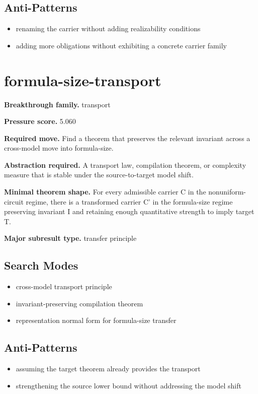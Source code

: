 \documentclass[11pt]{article}
\begin{document}
\subsection*{Anti-Patterns}
\begin{itemize}[leftmargin=*,itemsep=0.2em]
\item renaming the carrier without adding realizability conditions
\item adding more obligations without exhibiting a concrete carrier family
\end{itemize}
\section{formula-size-transport}
\textbf{Breakthrough family.} transport

\textbf{Pressure score.} 5.060

\textbf{Required move.} Find a theorem that preserves the relevant invariant across a cross-model move into formula-size.

\textbf{Abstraction required.} A transport law, compilation theorem, or complexity measure that is stable under the source-to-target model shift.

\textbf{Minimal theorem shape.} For every admissible carrier C in the nonuniform-circuit regime, there is a transformed carrier C' in the formula-size regime preserving invariant I and retaining enough quantitative strength to imply target T.

\textbf{Major subresult type.} transfer principle

\subsection*{Search Modes}
\begin{itemize}[leftmargin=*,itemsep=0.2em]
\item cross-model transport principle
\item invariant-preserving compilation theorem
\item representation normal form for formula-size transfer
\end{itemize}
\subsection*{Anti-Patterns}
\begin{itemize}[leftmargin=*,itemsep=0.2em]
\item assuming the target theorem already provides the transport
\item strengthening the source lower bound without addressing the model shift
\end{itemize}
\end{document}
